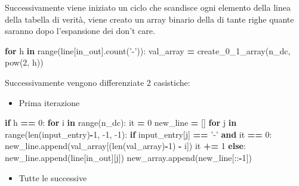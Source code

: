 \documentclass[italian,]{book}
\newenvironment{Shaded}{\begin{snugshade}}{\end{snugshade}}
\newcommand{\BuiltInTok}[1]{#1}
\newcommand{\ControlFlowTok}[1]{\textcolor[rgb]{0.13,0.29,0.53}{\textbf{#1}}}
\newcommand{\DecValTok}[1]{\textcolor[rgb]{0.00,0.00,0.81}{#1}}
\newcommand{\KeywordTok}[1]{\textcolor[rgb]{0.13,0.29,0.53}{\textbf{#1}}}
\newcommand{\NormalTok}[1]{#1}
\newcommand{\OperatorTok}[1]{\textcolor[rgb]{0.81,0.36,0.00}{\textbf{#1}}}
\newcommand{\StringTok}[1]{\textcolor[rgb]{0.31,0.60,0.02}{#1}}
\providecommand{\tightlist}{%
  \setlength{\itemsep}{0pt}\setlength{\parskip}{0pt}}
\begin{document}
\newpage

Successivamente viene iniziato un ciclo che scandisce ogni elemento della linea della tabella di verità, viene creato un array binario della di tante righe quante saranno dopo l'espansione dei don't care.

\begin{Shaded}
\begin{Highlighting}[]
\ControlFlowTok{for}\NormalTok{ h }\KeywordTok{in} \BuiltInTok{range}\NormalTok{(line[in_out].count(}\StringTok{'-'}\NormalTok{)):}
\NormalTok{  val_array }\OperatorTok{=}\NormalTok{ create_0_1_array(n_dc, }\BuiltInTok{pow}\NormalTok{(}\DecValTok{2}\NormalTok{, h))}
\end{Highlighting}
\end{Shaded}

Successivamente vengono differenziate 2 casistiche:

\begin{itemize}
\tightlist
\item
  Prima iterazione
\end{itemize}

\begin{Shaded}
\begin{Highlighting}[]
\ControlFlowTok{if}\NormalTok{ h }\OperatorTok{==} \DecValTok{0}\NormalTok{:}
  \ControlFlowTok{for}\NormalTok{ i }\KeywordTok{in} \BuiltInTok{range}\NormalTok{(n_dc):}
\NormalTok{    it }\OperatorTok{=} \DecValTok{0}
\NormalTok{    new_line }\OperatorTok{=}\NormalTok{ []}
    \ControlFlowTok{for}\NormalTok{ j }\KeywordTok{in} \BuiltInTok{range}\NormalTok{(}\BuiltInTok{len}\NormalTok{(input_entry)}\OperatorTok{-}\DecValTok{1}\NormalTok{, }\DecValTok{-1}\NormalTok{, }\DecValTok{-1}\NormalTok{):}
      \ControlFlowTok{if}\NormalTok{ input_entry[j] }\OperatorTok{==} \StringTok{'-'} \KeywordTok{and}\NormalTok{ it }\OperatorTok{==} \DecValTok{0}\NormalTok{:}
\NormalTok{        new_line.append(val_array[(}\BuiltInTok{len}\NormalTok{(val_array)}\OperatorTok{-}\DecValTok{1}\NormalTok{) }\OperatorTok{-}\NormalTok{ i])}
\NormalTok{        it }\OperatorTok{+=} \DecValTok{1}
      \ControlFlowTok{else}\NormalTok{:}
\NormalTok{        new_line.append(line[in_out][j])}
\NormalTok{    new_array.append(new_line[::}\OperatorTok{-}\DecValTok{1}\NormalTok{])}
\end{Highlighting}
\end{Shaded}

\begin{itemize}
\tightlist
\item
  Tutte le successive
\end{itemize}
\end{document}
